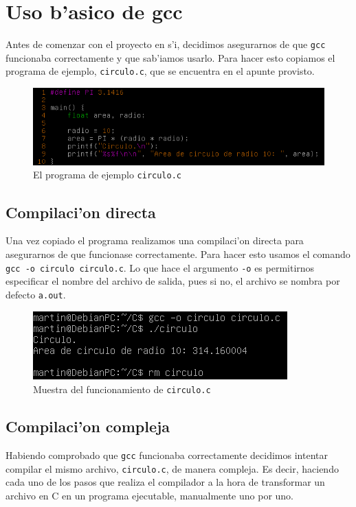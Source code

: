 \documentclass[11pt]{article}
\begin{document}
		
	\section{Uso b'asico de gcc}
		Antes de comenzar con el proyecto en s'i, decidimos asegurarnos de que \texttt{gcc} funcionaba correctamente y que sab'iamos usarlo. Para hacer esto copiamos el programa de ejemplo, \texttt{circulo.c}, que se encuentra en el apunte provisto.
		
		\begin{figure}[H]
			\centering
			\includegraphics[width=.9\linewidth]{Images/Seccion 1/S1}
			\caption{El programa de ejemplo \texttt{circulo.c}}
			\label{fig:circle-code}
		\end{figure}
		
	\subsection{Compilaci'on directa}
		Una vez copiado el programa realizamos una compilaci'on directa para asegurarnos de que funcionase correctamente. Para hacer esto usamos el comando \texttt{gcc -o circulo circulo.c}. Lo que hace el argumento \texttt{-o} es permitirnos especificar el nombre del archivo de salida, pues si no, el archivo se nombra por defecto \texttt{a.out}.
		
		\begin{figure}[H]
			\centering
			\includegraphics[width=.7\linewidth]{Images/Seccion 1/S1 parte dos}
			\caption{Muestra del funcionamiento de \texttt{circulo.c}}
			\label{fig:basic-compilation}
		\end{figure}
		
	\subsection{Compilaci'on compleja}
		Habiendo comprobado que \texttt{gcc} funcionaba correctamente decidimos intentar compilar el mismo archivo, \texttt{circulo.c}, de manera compleja. Es decir, haciendo cada uno de los pasos que realiza el compilador a la hora de transformar un archivo en C en un programa ejecutable, manualmente uno por uno.
	
\end{document}
